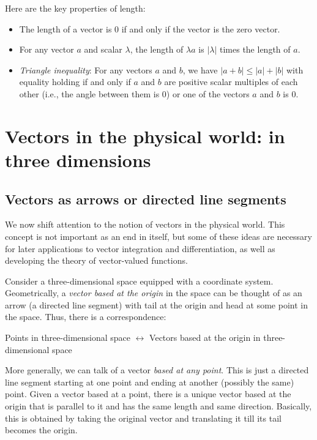 \documentclass[10pt]{amsart}
\begin{document}
Here are the key properties of length:

\begin{itemize}
\item The length of a vector is $0$ if and only if the vector is the
  zero vector.
\item For any vector $a$ and scalar $\lambda$, the length of $\lambda
  a$ is $|\lambda|$ times the length of $a$.
\item {\em Triangle inequality}: For any vectors $a$ and $b$, we have
  $|a + b| \le |a| + |b|$ with equality holding if and only if $a$ and
  $b$ are positive scalar multiples of each other (i.e., the angle
  between them is $0$) or one of the vectors $a$ and $b$ is $0$.
\end{itemize}

\section{Vectors in the physical world: in three dimensions}

\subsection{Vectors as arrows or directed line segments}

We now shift attention to the notion of vectors in the physical
world. This concept is not important as an end in itself, but some of
these ideas are necessary for later applications to vector integration
and differentiation, as well as developing the theory of vector-valued
functions.

Consider a three-dimensional space equipped with a coordinate system.
Geometrically, a {\em vector based at the origin} in the space can be
thought of as an arrow (a directed line segment) with tail at the
origin and head at some point in the space. Thus, there is a
correspondence:

Points in three-dimensional space $\leftrightarrow$ Vectors based at
the origin in three-dimensional space

More generally, we can talk of a vector {\em based at any point}. This
is just a directed line segment starting at one point and ending at
another (possibly the same) point. Given a vector based at a point,
there is a unique vector based at the origin that is parallel to it
and has the same length and same direction. Basically, this is
obtained by taking the original vector and translating it till its
tail becomes the origin.
\end{document}
